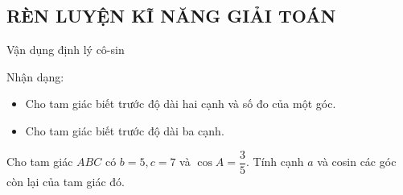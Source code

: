 \subsection{RÈN LUYỆN KĨ NĂNG GIẢI TOÁN}

\begin{dang}{Vận dụng định lý cô-sin}
	\begin{luuy}
		Nhận dạng:
		\begin{itemize}
			\item [$\bullet$] Cho tam giác biết trước độ dài hai cạnh và số đo của một góc.
			\item [$\bullet$] Cho tam giác biết trước độ dài ba cạnh.
		\end{itemize}
	\end{luuy}
\end{dang}

\begin{vd}
	Cho tam giác $ABC$ có $b=5, c=7$ và $\cos A=\dfrac{3}{5}$. Tính cạnh $a$ và cosin các góc còn lại của tam giác đó.
\end{vd}

